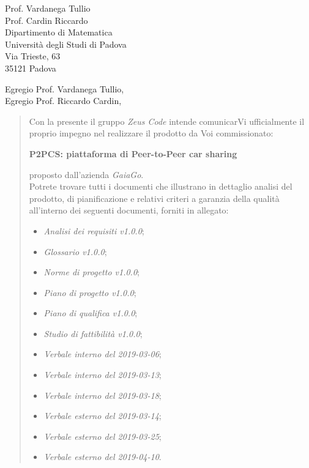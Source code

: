 \begin{letter}{
		Prof. Vardanega Tullio \\
		Prof. Cardin Riccardo \\
		Dipartimento di Matematica \\
		Università degli Studi di Padova \\
		Via Trieste, 63 \\
		35121 Padova}
		
\opening{Egregio Prof. Vardanega Tullio,\\Egregio Prof. Riccardo Cardin,}

\begin{quotation}
Con la presente il gruppo \textit{Zeus Code} intende comunicarVi ufficialmente il proprio impegno nel realizzare il prodotto da Voi 
commissionato:

\begin{center}
	\textbf{P2PCS: piattaforma di Peer-to-Peer car sharing}
\end{center}

\noindent proposto dall'azienda \textit{GaiaGo}.\\
Potrete trovare tutti i documenti che illustrano in dettaglio analisi del prodotto, di pianificazione e relativi criteri a garanzia della qualità all'interno dei seguenti 
documenti, forniti in allegato:

\begin{itemize}
	\item \textit{Analisi dei requisiti v1.0.0};
	
	\item \textit{Glossario v1.0.0};
	
	\item \textit{Norme di progetto v1.0.0};

	\item \textit{Piano di progetto v1.0.0};

	\item \textit{Piano di qualifica v1.0.0};

	\item \textit{Studio di fattibilità v1.0.0};

	\item \textit{Verbale interno del 2019-03-06};
	\item \textit{Verbale interno del 2019-03-13};
	\item \textit{Verbale interno del 2019-03-18};
	
	\item \textit{Verbale esterno del 2019-03-14};
	\item \textit{Verbale esterno del 2019-03-25};
	\item \textit{Verbale esterno del 2019-04-10}.
\end{itemize}


\end{quotation}
\end{letter}
